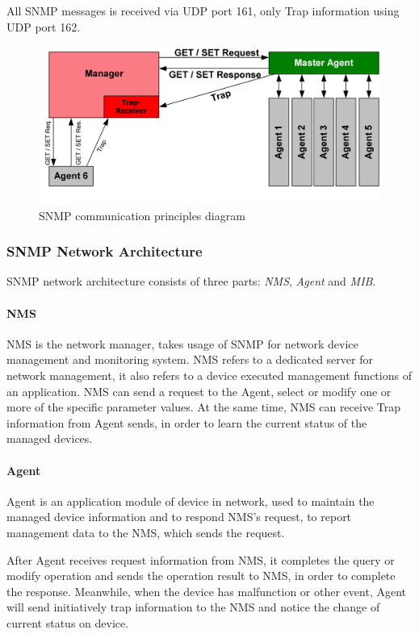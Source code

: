 All SNMP messages is received via UDP port 161, only Trap information using UDP port 162.

\begin{figure}[!ht]
	\caption{SNMP communication principles diagram}
	\includegraphics[width=\textwidth]{images/SNMP_communication_principles_diagram}
\end{figure}

\subsubsection{SNMP Network Architecture}

SNMP network architecture consists of three parts: \textit{NMS}, \textit{Agent} and \textit{MIB}.

\paragraph{NMS}

NMS is the network manager, takes usage of SNMP for network device management and monitoring system. NMS refers to a dedicated server for network management, it also refers to a device executed management functions of an application.  
NMS can send a request to the Agent, select or modify one or more of the specific parameter values. At the same time, NMS can receive Trap information from Agent sends, in order to learn the current status of the managed devices.  

\paragraph{Agent}

Agent is an application module of device in network, used to maintain the managed device information and to respond NMS's request, to report management data to the NMS, which sends the request.  

After Agent receives request information from NMS, it completes the query or modify operation and sends the operation result to NMS, in order to complete the response. Meanwhile, when the device has malfunction or other event, Agent will send initiatively trap information to the NMS and notice the change of current status on device.  


